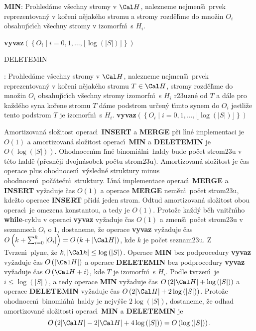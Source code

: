 {\bf MIN}:\newline 
Prohled\'ame v\v sechny stromy v $\Cal H$, nalezneme nejmen\v s\'\i\ prvek 
repre\-zentovan\'y v ko\v reni n\v ejak\'eho stromu a stromy 
rozd\v el\'\i me do mno\v zin $O_i$ obsahuj\'\i c\'\i ch v\v sechny stromy v 
izomorfn\'\i\ s $H_i$.\newline 
{\bf vyvaz$\left(\left\{O_i\mid i=0,1,\dots,\lfloor\log\left(|S|\right)\rfloor \right\}\right)$
\bigskip

DELETEMIN}:\newline 
Prohled\'ame v\v sechny stromy v $\Cal H$, nalezneme nejmen\v s\'\i\ prvek 
repre\-zentovan\'y v ko\v reni n\v ejak\'eho stromu $T\in \Cal H$, stromy 
rozd\v e\-l\'\i me do mno\v zin $O_i$ obsahuj\'\i c\'\i ch v\v sechny stromy  
izomorfn\'\i\ s $H_i$ r\accent23uzn\'e od $T$ a d\'ale pro ka\v zd\'eho syna 
ko\v rene stromu $T$ d\'ame podstrom ur\v cen\'y t\'\i mto synem do 
$O_i$ jestli\v ze tento podstrom $T$ je izomorfn\'\i\ s $H_i$.\newline 
{\bf vyvaz$\left(\left\{O_i\mid i=0,1,\dots,\lfloor\log\left(|S|\right)\rfloor \right\}\right)$}
\bigskip

\flushpar Amortizovan\'a slo\v zitost operac\'\i\ 
{\bf INSERT} a {\bf MER\-GE} p\v ri l\'\i n\'e implementaci je $O
\left(1\right)$ a 
amortizovan\'a slo\v zitost operac\'\i\ {\bf MIN} a {\bf DELETEMIN  }
je $O\left(\log\left(|S|\right)\right)$. Ohodnocen\'\i m l\'\i n\'e 
binomi\'aln\'\i\ haldy bude po\v cet strom\accent23u v t\'eto 
hald\v e (p\v resn\v eji dvojn\'asobek po\v ctu strom\accent23u). 
Amortizovan\'a slo\v zitost je \v cas operace plus 
ohodnocen\'\i\ v\'ysledn\'e struktury minus ohodnocen\'\i\ 
po\v c\'ate\v cn\'\i\ struktury. L\'\i n\'a implementace operac\'\i\ {\bf MER\-GE} a {\bf INSERT  }
vy\v zaduje \v cas $O\left(1\right)$ a operace {\bf MERGE} nem\v e\-n\'\i\ 
po\v cet strom\accent23u, kde\v zto operace {\bf INSERT} p\v rid\'a jeden 
strom. Odtud amortizovan\'a slo\v zitost obou operac\'\i\ je 
omezena kons\-tantou, a tedy je $O\left(1\right)$. Proto\v ze ka\v zd\'y b\v eh 
vnit\v rn\'\i ho {\bf while}-cyklu v operaci {\bf vyvaz} vy\v zaduje \v cas $
O\left(1\right)$ 
a zmen\v s\'\i\ po\v cet stro\-m\accent23u v seznamech $O_i$ o $1$, 
dostaneme, \v ze ope\-ra\-ce {\bf vyvaz} vy\v zaduje \v cas $O\left(k+\sum_{i=0}^k|O_i|
\right)=O\left(k+|\Cal H|\right)$, kde $k$ je po\v cet 
seznam\accent23u. Z Tvrzen\'\i\ plyne, \v ze $k,|\Cal h|\le\log\left(|S|\right)$. Ope\-ra\-ce {\bf MIN}
bez podprocedury {\bf vyvaz} vy\v zaduje \v cas $O\left(|\Cal H|\right)$ a operace 
{\bf DE\-LE\-TEMIN} bez podprocedury {\bf vyvaz} vy\v zaduje \v cas $
O\left(\Cal H+i\right)$, 
kde $T$ je izomorfn\'\i\ s $H_i$. Podle tvrzen\'\i\ je $i\le\log\left(
|S|\right)$, a 
tedy ope\-ra\-ce {\bf MIN} vy\v zaduje \v cas $O\left(2|\Cal H|+\log\left(|S|\right)\right)$ a ope\-race 
{\bf DE\-LE\-TEMIN} vy\-\v zaduje \v cas $O\left(2|\Cal H|+2\log\left(|S|\right)\right)$. Proto\v ze  
ohodnocen\'\i\ binomi\'aln\'\i\ haldy je nejv\'y\v se $2\log\left(|S|\right)$, 
dostaneme, \v ze odhad  
amortizovan\'e slo\v zitosti operac\'\i\ {\bf MIN} a {\bf DELETEMIN} je
$$O\left(2|\Cal H|-2|\Cal H|+4\log\left(|S|\right)\right)=O\left(\log\left(|S|\right)\right).$$
\medskip

